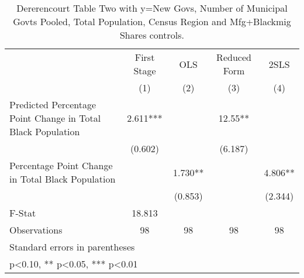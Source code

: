 \begin{table}[htbp]\centering
\def\sym#1{\ifmmode^{#1}\else\(^{#1}\)\fi}
\caption{Dererencourt Table Two with y=New Govs, Number of Municipal Govts  Pooled, Total Population, Census Region and Mfg+Blackmig Shares controls.}
\begin{tabular}{l*{4}{c}}
\toprule
                    & First Stage   &         OLS   &Reduced Form   &        2SLS   \\
                    &\multicolumn{1}{c}{(1)}   &\multicolumn{1}{c}{(2)}   &\multicolumn{1}{c}{(3)}   &\multicolumn{1}{c}{(4)}   \\
\midrule
Predicted Percentage Point Change in Total Black Population&       2.611***&               &       12.55** &               \\
                    &     (0.602)   &               &     (6.187)   &               \\
\addlinespace
Percentage Point Change in Total Black Population&               &       1.730** &               &       4.806** \\
                    &               &     (0.853)   &               &     (2.344)   \\
\midrule
F-Stat              &      18.813   &               &               &               \\
Observations        &          98   &          98   &          98   &          98   \\
\bottomrule
\multicolumn{5}{l}{\footnotesize Standard errors in parentheses}\\
\multicolumn{5}{l}{\footnotesize * p<0.10, ** p<0.05, *** p<0.01}\\
\end{tabular}
\end{table}

